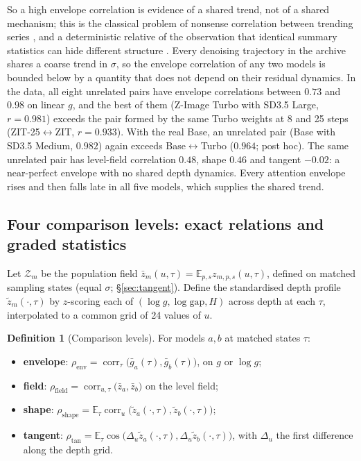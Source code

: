 \documentclass[11pt]{article}
\theoremstyle{definition}
\newtheorem{definition}[theorem]{Definition}
\newcommand{\E}{\mathbb{E}}
\newcommand{\gap}{\mathrm{gap}}
\newcommand{\TT}{ZIT-25}%
\begin{document}
So a high envelope correlation is evidence of a shared trend, not of a shared mechanism; this is the classical problem of nonsense correlation between trending series \citep{yule1926why,granger1974spurious}, and a deterministic relative of the observation that identical summary statistics can hide different structure \citep{matejka2017same}. Every denoising trajectory in the archive shares a coarse trend in $\sigma$, so the envelope correlation of any two models is bounded below by a quantity that does not depend on their residual dynamics. In the data, all eight unrelated pairs have envelope correlations between $0.73$ and $0.98$ on linear $g$, and the best of them (Z-Image Turbo with SD3.5 Large, $r=0.981$) exceeds the pair formed by the same Turbo weights at 8 and 25 steps (\TT{}$\leftrightarrow$ZIT, $r=0.933$). With the real Base, an unrelated pair (Base with SD3.5 Medium, $0.982$) again exceeds Base$\leftrightarrow$Turbo ($0.964$; post hoc). The same unrelated pair has level-field correlation $0.48$, shape $0.46$ and tangent $-0.02$: a near-perfect envelope with no shared depth dynamics. Every attention envelope rises and then falls late in all five models, which supplies the shared trend.

\subsection{Four comparison levels: exact relations and graded statistics}
Let $\mathcal Z_m$ be the population field $\bar z_m(u,\tau)=\E_{p,s}z_{m,p,s}(u,\tau)$, defined on matched sampling states (equal $\sigma$; \S\ref{sec:tangent}). Define the standardised depth profile $\tilde z_m(\cdot,\tau)$ by $z$-scoring each of $(\log g,\log\gap,H)$ across depth at each $\tau$, interpolated to a common grid of 24 values of $u$.

\begin{definition}[Comparison levels]\label{def:levels}
For models $a,b$ at matched states $\tau$:
\begin{itemize}
 \item \textbf{envelope}: $\rho_{\mathrm{env}}=\operatorname{corr}_\tau\big(\bar g_a(\tau),\bar g_b(\tau)\big)$, on $g$ or $\log g$;
 \item \textbf{field}: $\rho_{\mathrm{field}}=\operatorname{corr}_{u,\tau}\big(\bar z_a,\bar z_b\big)$ on the level field;
 \item \textbf{shape}: $\rho_{\mathrm{shape}}=\E_\tau\operatorname{corr}_u\big(\tilde z_a(\cdot,\tau),\tilde z_b(\cdot,\tau)\big)$;
 \item \textbf{tangent}: $\rho_{\mathrm{tan}}=\E_\tau\cos\big(\Delta_u\tilde z_a(\cdot,\tau),\Delta_u\tilde z_b(\cdot,\tau)\big)$, with $\Delta_u$ the first difference along the depth grid.
\end{itemize}
\end{definition}
\end{document}
